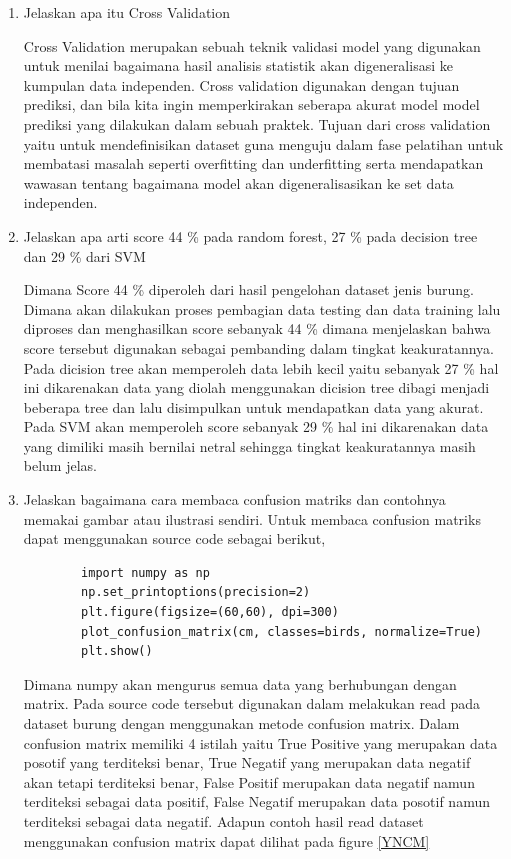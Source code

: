 \begin{enumerate}
\item Jelaskan apa itu Cross Validation 
\par 
Cross Validation merupakan sebuah teknik validasi model yang digunakan untuk menilai bagaimana hasil analisis statistik akan digeneralisasi ke kumpulan data independen. Cross validation digunakan dengan tujuan prediksi, dan bila kita ingin memperkirakan seberapa akurat model model prediksi yang dilakukan dalam sebuah praktek. Tujuan dari cross validation yaitu untuk mendeﬁnisikan dataset guna menguju dalam fase pelatihan untuk membatasi masalah seperti overﬁtting dan underﬁtting serta mendapatkan wawasan tentang bagaimana model akan digeneralisasikan ke set data independen.

\item Jelaskan apa arti score 44 \% pada random forest, 27 \% pada decision tree dan 29 \% dari SVM \par Dimana Score 44 \% diperoleh dari hasil pengelohan dataset jenis burung. Dimana akan dilakukan proses pembagian data testing dan data training lalu diproses dan menghasilkan score sebanyak 44 \% dimana menjelaskan bahwa score tersebut digunakan sebagai pembanding dalam tingkat keakuratannya. Pada dicision tree akan memperoleh data lebih kecil yaitu sebanyak 27 \% hal ini dikarenakan data yang diolah menggunakan dicision tree dibagi menjadi beberapa tree dan lalu disimpulkan untuk mendapatkan data yang akurat. Pada SVM akan memperoleh score sebanyak 29 \% hal ini dikarenakan data yang dimiliki masih bernilai netral sehingga tingkat keakuratannya masih belum jelas.

\item Jelaskan bagaimana cara membaca confusion matriks dan contohnya memakai gambar atau ilustrasi sendiri.
Untuk membaca confusion matriks dapat menggunakan source code sebagai berikut,
	\begin{verbatim}
		import numpy as np
		np.set_printoptions(precision=2)
		plt.figure(figsize=(60,60), dpi=300)
		plot_confusion_matrix(cm, classes=birds, normalize=True)
		plt.show()
	\end{verbatim}

Dimana numpy akan mengurus semua data yang berhubungan dengan matrix. Pada source code tersebut digunakan dalam melakukan read pada dataset burung dengan menggunakan metode confusion matrix. Dalam confusion matrix memiliki 4 istilah yaitu True Positive yang merupakan data posotif yang terditeksi benar, True Negatif yang merupakan data negatif akan tetapi terditeksi benar, False Positif merupakan data negatif namun terditeksi sebagai data positif, False Negatif merupakan data posotif namun terditeksi sebagai data negatif. Adapun contoh hasil read dataset menggunakan confusion matrix dapat dilihat pada figure \ref{YNCM}
	

\end{enumerate}
